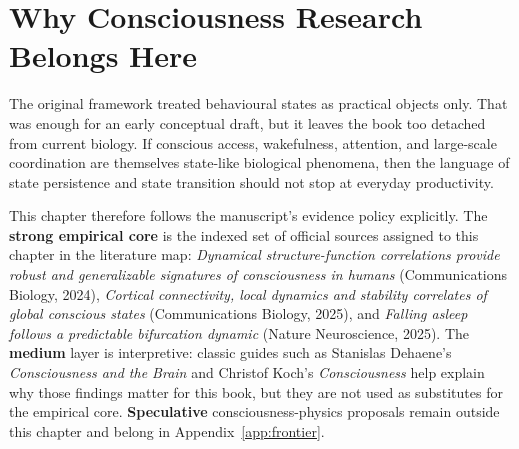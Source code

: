 \section{Why Consciousness Research Belongs Here}

The original framework treated behavioural states as practical objects only.
That was enough for an early conceptual draft, but it leaves the book too
detached from current biology. If conscious access, wakefulness, attention,
and large-scale coordination are themselves state-like biological phenomena,
then the language of state persistence and state transition should not stop at
everyday productivity.

This chapter therefore follows the manuscript's evidence policy explicitly. The
\textbf{strong empirical core} is the indexed set of official sources assigned
to this chapter in the literature map: \emph{Dynamical structure-function
correlations provide robust and generalizable signatures of consciousness in
humans} (Communications Biology, 2024),
\emph{Cortical connectivity, local dynamics and stability correlates of global
conscious states} (Communications Biology, 2025), and
\emph{Falling asleep follows a predictable bifurcation dynamic}
(Nature Neuroscience, 2025). The \textbf{medium} layer is interpretive:
classic guides such as Stanislas Dehaene's \emph{Consciousness and the Brain}
and Christof Koch's \emph{Consciousness} help explain why those findings
matter for this book, but they are not used as substitutes for the empirical
core. \textbf{Speculative} consciousness-physics proposals remain outside this
chapter and belong in Appendix~\ref{app:frontier}.
